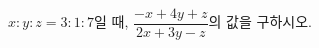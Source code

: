 \hspace*{2mm}\begin{minipage}[t]{\dimexpr\linewidth-2mm\relax}\vspace{0pt}
$x:y:z=3:1:7$일 때, $\dfrac{-x+4y+z}{2x+3y-z}$의 값을 구하시오.\end{minipage}
